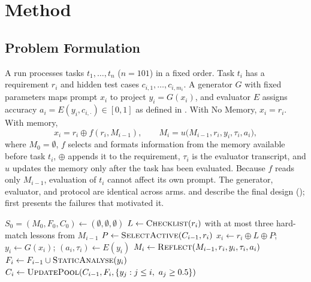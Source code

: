 \chapter{Method}
\label{chap:method}

\section{Problem Formulation}
\label{sec:formulation}
A run processes tasks $t_1,\dots,t_n$ ($n=101$) in a fixed order. Task $t_i$ has a requirement $r_i$ and hidden test cases $c_{i,1},\dots,c_{i,m_i}$. A generator $G$ with fixed parameters maps prompt $x_i$ to project $y_i=G(x_i)$, and evaluator $E$ assigns accuracy $a_i=E(y_i, c_{i,\cdot})\in[0,1]$ as defined in . With No Memory, $x_i=r_i$. With memory,
\begin{equation}
x_i = r_i \oplus f(r_i, M_{i-1}), \qquad M_i = u\bigl(M_{i-1}, r_i, y_i, \tau_i, a_i\bigr),
\end{equation}
where $M_0=\emptyset$, $f$ selects and formats information from the memory available before task $t_i$, $\oplus$ appends it to the requirement, $\tau_i$ is the evaluator transcript, and $u$ updates the memory only after the task has been evaluated. Because $f$ reads only $M_{i-1}$, evaluation of $t_i$ cannot affect its own prompt. The generator, evaluator, and protocol are identical across arms.  and  describe the final design ();  first presents the failures that motivated it.

\begin{algorithm}[ht]
\caption{Cross-task memory for one run (final version).}
\label{alg:pipeline}
\begin{algorithmic}[1]
\State $S_0=(M_0,F_0,C_0) \gets (\emptyset,\emptyset,\emptyset)$ 
  \State $L \gets \textsc{Checklist}(r_i)$ with at most three hard-match lessons from $M_{i-1}$
  \State $P \gets \textsc{SelectActive}(C_{i-1}, r_i)$ 
  \State $x_i \gets r_i \oplus L \oplus P$; \quad $y_i \gets G(x_i)$; \quad $(a_i,\tau_i) \gets E(y_i)$
  \State $M_i \gets \textsc{Reflect}(M_{i-1}, r_i, y_i, \tau_i, a_i)$ 
  \State $F_i \gets F_{i-1} \cup \textsc{StaticAnalyse}(y_i)$
  \State $C_i \gets \textsc{UpdatePool}(C_{i-1}, F_i, \{y_j : j\le i,\ a_j \ge 0.5\})$ 
\EndFor
\end{algorithmic}
\end{algorithm}

